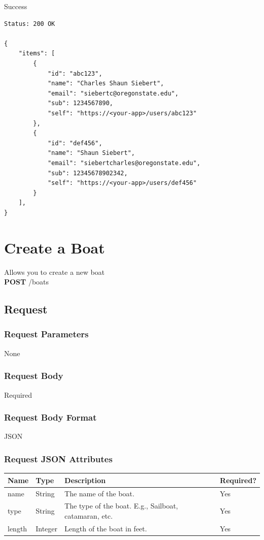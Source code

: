 \documentclass[letterpaper,11pt,titlepage,draftclsnofoot,onecolumn,compsoc,utf8,latin1]{IEEEtran}
\begin{document}
\begin{singlespace}
\noindent \Large{Success}

\begin{lstlisting}[]
Status: 200 OK

{
    "items": [
        {
            "id": "abc123",
            "name": "Charles Shaun Siebert",
            "email": "siebertc@oregonstate.edu",
            "sub": 1234567890,
            "self": "https://<your-app>/users/abc123"
        },
        {
            "id": "def456",
            "name": "Shaun Siebert",
            "email": "siebertcharles@oregonstate.edu",
            "sub": 12345678902342,
            "self": "https://<your-app>/users/def456"
        }
    ],
}
\end{lstlisting}

\newpage 


\section{Create a Boat}

Allows you to create a new boat\\

\noindent \textbf{POST} /boats

\subsection{Request}

\subsubsection{Request Parameters}

None

\subsubsection{Request Body}

Required

\subsubsection{Request Body Format}

JSON

\subsubsection{Request JSON Attributes}

\begin{center}
\begin{tabular}{ |p{}|p{}|p{}|p{}| } 
 \hline
 \textbf{Name} & \textbf{Type} & \textbf{Description} & \textbf{Required?} \\  \hline
 name & String & The name of the boat. & Yes  \\ \hline
 type & String & The type of the boat. E.g., Sailboat, catamaran, etc. & Yes \\ \hline 
 length & Integer & Length of the boat in feet. & Yes \\ 
 \hline
\end{tabular}
\end{center}


\end{singlespace}
\end{document}
